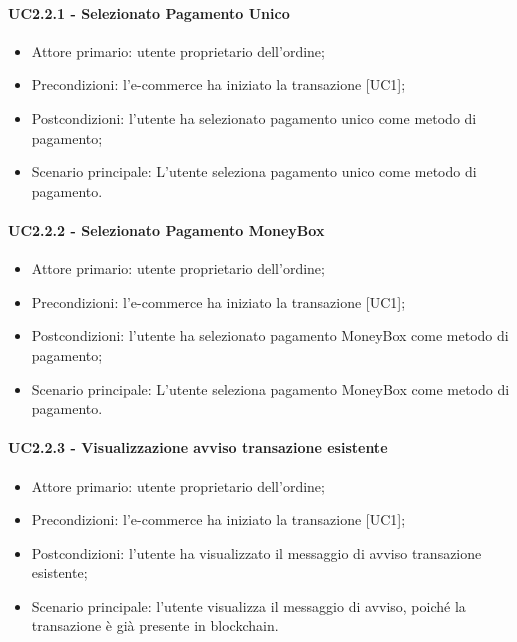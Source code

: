 \paragraph{UC2.2.1 - Selezionato Pagamento Unico}\label{sssec: UC2.2.1}

\begin{itemize}
    \item Attore primario: utente proprietario dell'ordine;
    \item Precondizioni: l'e-commerce\glo{} ha iniziato la transazione [UC1];
    \item Postcondizioni: l'utente ha selezionato pagamento unico come metodo di pagamento;
    \item Scenario principale: L'utente seleziona pagamento unico come metodo di pagamento.
\end{itemize}

\paragraph{UC2.2.2 - Selezionato Pagamento MoneyBox}

\begin{itemize}
    \item Attore primario: utente proprietario dell'ordine;
    \item Precondizioni: l'e-commerce\glo{} ha iniziato la transazione [UC1];
    \item Postcondizioni: l'utente ha selezionato pagamento MoneyBox\glo{} come metodo di pagamento;
    \item Scenario principale: L'utente seleziona pagamento MoneyBox\glo{} come metodo di pagamento.
\end{itemize}

\paragraph{UC2.2.3 - Visualizzazione avviso transazione esistente}

\begin{itemize}
    \item Attore primario: utente proprietario dell'ordine;
    \item Precondizioni: l'e-commerce\glo{} ha iniziato la transazione [UC1];
    \item Postcondizioni: l'utente ha visualizzato il messaggio di avviso transazione esistente;
    \item Scenario principale: l'utente visualizza il messaggio di avviso, poiché la transazione è già presente in blockchain\glo{}.
\end{itemize}

